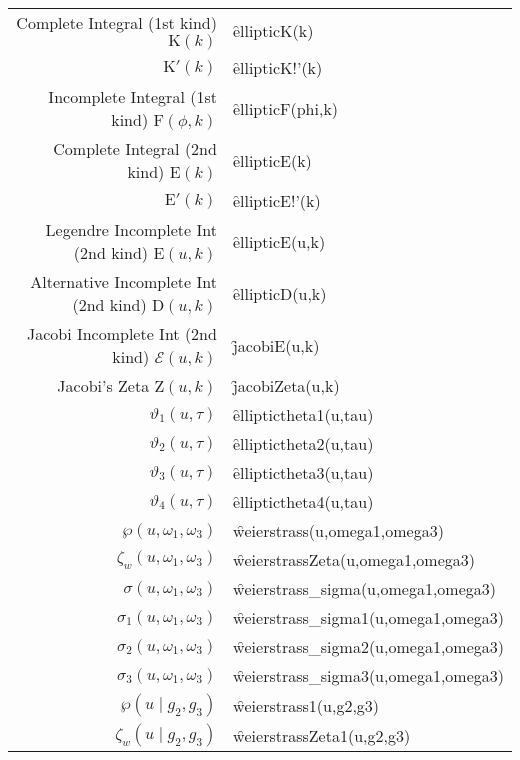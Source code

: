 {\begin{tabular}{r l}
Complete Integral (1st kind) $\mathrm{K}(k)$ & \f{ellipticK(k)}\\
$\mathrm{K}'(k)$ & \f{ellipticK!'(k)}\\
Incomplete Integral (1st kind) $\mathrm{F}(\phi,k)$ & \f{ellipticF(phi,k)}\\
Complete Integral (2nd kind) $\mathrm{E}(k)$ & \f{ellipticE(k)}\\
$\mathrm{E}'(k)$ & \f{ellipticE!'(k)}\\
Legendre Incomplete Int (2nd kind) $\mathrm{E}(u,k)$ & \f{ellipticE(u,k)}\\
Alternative Incomplete Int (2nd kind) $\mathrm{D}(u,k)$ & \f{ellipticD(u,k)}\\
Jacobi Incomplete Int (2nd kind) $\mathcal{E}(u,k)$ & \f{jacobiE(u,k)}\\
Jacobi's Zeta $\mathrm{Z}(u,k)$ & \f{jacobiZeta(u,k)}\\
$\vartheta_1(u,\tau)$ & \f{elliptictheta1(u,tau)}\\
$\vartheta_2(u,\tau)$ & \f{elliptictheta2(u,tau)}\\
$\vartheta_3(u,\tau)$ & \f{elliptictheta3(u,tau)}\\
$\vartheta_4(u,\tau)$ & \f{elliptictheta4(u,tau)}\\
$\wp(u,\omega_1, \omega_3)$ & \f{weierstrass(u,omega1,omega3)}\\
$\zeta_w(u,\omega_1, \omega_3)$ & \f{weierstrassZeta(u,omega1,omega3)}\\
$\sigma(u,\omega_1, \omega_3)$ & \f{weierstrass\_sigma(u,omega1,omega3)}\\
$\sigma_1(u,\omega_1, \omega_3)$ & \f{weierstrass\_sigma1(u,omega1,omega3)}\\
$\sigma_2(u,\omega_1, \omega_3)$ & \f{weierstrass\_sigma2(u,omega1,omega3)}\\
$\sigma_3(u,\omega_1, \omega_3)$ & \f{weierstrass\_sigma3(u,omega1,omega3)}\\
$\wp(u \mid g_2, g_3)$ & \f{weierstrass1(u,g2,g3)}\\
$\zeta_w(u \mid g_2, g_3)$ & \f{weierstrassZeta1(u,g2,g3)}\\[5pt]
\end{tabular}}
